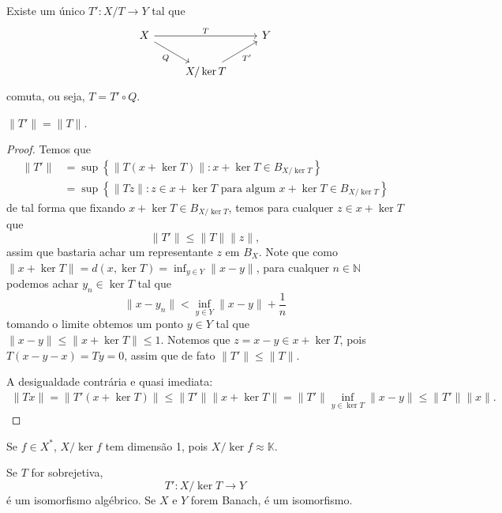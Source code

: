\documentclass[portuguese]{article}
\theoremstyle{definition}
\newcommand{\N}{\mathbb{N}}
\begin{document}
	\begin{teo}
		Existe um único $T':X/T\to Y$ tal que
		\[\begin{tikzcd}
			X\arrow[rr,"T"]\arrow[dr,"Q",swap]&&Y\\
			&X/\ker T\arrow[ur,"T'",swap]
		\end{tikzcd}\]
		comuta, ou seja, $T=T'\circ Q$.
	\end{teo}
	\begin{exer*}
		$\| T'\|=\| T\|$.
	\end{exer*}
	\begin{proof}
		Temos que
		\begin{align*}
			\| T'\|&=\sup\left\{\| T(x+\ker T)\|:x+\ker T\in B_{X/\ker T}\right\}\\
			&=\sup \left\{\| Tz\|:z\in x+\ker T\text{ para algum }x +\ker T\in B_{X/\ker T}\right\}
		\end{align*}
		de tal forma que fixando $x +\ker T \in B_{X/\ker T}$, temos para cualquer $z\in x+\ker T$ que
		\[\| T'\|\leq\| T\|\| z\|,\]
		assim que bastaria achar um representante $z$ em $B_X$. Note que como $\| x+\ker T\|=d(x,\ker T)=\inf_{y\in Y}\| x-y\|$,
		para cualquer $n\in\N$ podemos achar $y_n\in\ker T$ tal que
		\[\| x-y_n\|<\inf_{y\in Y}\| x-y\| +\frac{1}{n}\]
		tomando o limite obtemos um ponto $y\in Y$ tal que $\| x-y\|\leq\| x+\ker T\|\leq1$. Notemos que $z=x-y\in x+\ker T$, pois $T(x-y-x)=Ty=0$, assim que de fato $\| T'\|\leq\| T\|$.
		
		A desigualdade contrária e quasi imediata:
		\begin{align*}
			\| Tx\|=\| T'(x+\ker T)\|\leq\| T'\|\| x+\ker T\|= \| T'\|\inf_{y\in \ker T}\| x-y\|\leq\| T'\|\| x\|.
		\end{align*}	
	\end{proof}
	\begin{obs}
		Se $f\in X^*$, $X/\ker f$ tem dimensão 1, pois $X/\ker f\approx\mathbb{K}$.
	\end{obs}
	\begin{teo}
		Se $T$ for sobrejetiva,
		\[T':X/\ker T\to Y\]
		é um isomorfismo algébrico. Se $X$ e $Y$ forem Banach, é um isomorfismo.
	\end{teo}
	
\end{document}
